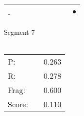 \documentclass[landscape]{article}
\newcommand{\ssp}{\hspace{2pt}}
\newcommand{\mex}{\cellcolor{g}$\bullet$}
\begin{document}
\begin{tabular}{|l|p{10pt}|p{10pt}|p{10pt}|p{10pt}|p{10pt}|p{10pt}|p{10pt}|p{10pt}|}
\hline
\ssp \cellcolor{ref7}. \ssp&\hspace{2pt}&\hspace{2pt}&\hspace{2pt}&\hspace{2pt}&\hspace{2pt}&\hspace{2pt}&\hspace{2pt}&\hspace{2pt}\mex\\
\hline
\end{tabular}

\vspace{6pt}
\noindent Segment 7\\\\
\noindent\begin{tabular}{lm{12pt}r}
\hline
P:&&0.263\\
R:&&0.278\\
Frag:&&0.600\\
Score:&&0.110\\
\end{tabular}

\newpage
\end{document}
